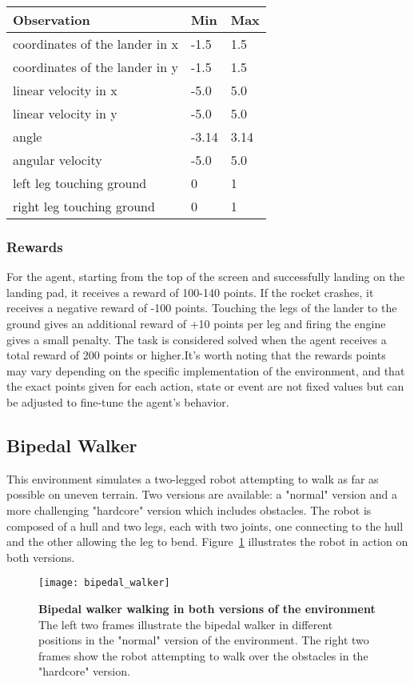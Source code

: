 \begin{table}[!ht]
\centering
\begin{tabular}{|l|l|l|}
\hline
\textbf{Observation} & \textbf{Min} & \textbf{Max} \\
\hline
coordinates of the lander in x & -1.5  & 1.5  \\
\hline
coordinates of the lander in y & -1.5  & 1.5  \\
\hline
linear velocity in x           & -5.0  & 5.0  \\
\hline
linear velocity in y           & -5.0  & 5.0  \\
\hline
angle                          & -3.14 & 3.14 \\
\hline
angular velocity               & -5.0  & 5.0  \\
\hline
left leg touching ground       & 0     & 1    \\
\hline
right leg touching ground      & 0     & 1   \\
\hline

\end{tabular}
\end{table}

\subsubsection{Rewards}
For the agent, starting from the top of the screen and successfully landing on the landing pad, it receives a reward of 100-140 points. If the rocket crashes, it receives a negative reward of -100 points. Touching the legs of the lander to the ground gives an additional reward of +10 points per leg and firing the engine gives a small penalty. The task is considered solved when the agent receives a total reward of 200 points or higher.It's worth noting that the rewards points may vary depending on the specific implementation of the environment, and that the exact points given for each action, state or event are not fixed values but can be adjusted to fine-tune the agent's behavior.

\subsection{Bipedal Walker}
This environment simulates a two-legged robot attempting to walk as far as possible on uneven terrain. Two versions are available: a "normal" version and a more challenging "hardcore" version which includes obstacles. The robot is composed of a hull and two legs, each with two joints, one connecting to the hull and the other allowing the leg to bend. Figure~\ref{fig:bipedal_walker} illustrates the robot in action on both versions.
\begin{figure}[!ht]
\centering
\texttt{[image: bipedal\_walker]}

\caption[Bipedal walker illustration]{
  \textbf{Bipedal walker walking in both versions of the environment}
The left two frames illustrate the bipedal walker in different positions in the "normal" version of the environment. The right two frames show the robot attempting to walk over the obstacles in the "hardcore" version.
 }
\label{fig:bipedal_walker}
\end{figure}
